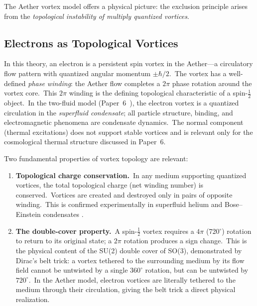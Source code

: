 ﻿\documentclass[12pt,letterpaper]{article}
\begin{document}
The Aether vortex model offers a physical picture: the exclusion principle arises
from the \emph{topological instability of multiply quantized vortices}.

\subsection{Electrons as Topological Vortices}

In this theory, an electron is a persistent spin vortex in the Aether---a
circulatory flow pattern with quantized angular momentum $\pm\hbar/2$.\ The
vortex has a well-defined \emph{phase winding}: the Aether flow completes a $2\pi$
phase rotation around the vortex core.\ This $2\pi$ winding is the defining
topological characteristic of a spin-$\tfrac{1}{2}$ object.\ In the two-fluid
model (Paper~6~\cite{otto-cosmology}), the electron vortex is a quantized
circulation in the \emph{superfluid condensate}; all particle structure, binding,
and electromagnetic phenomena are condensate dynamics.\ The normal component
(thermal excitations) does not support stable vortices and is relevant only for
the cosmological thermal structure discussed in Paper~6.

Two fundamental properties of vortex topology are relevant:

\begin{enumerate}[leftmargin=2em]
  \item \textbf{Topological charge conservation.}\ In any medium supporting
    quantized vortices, the total topological charge (net winding number) is
    conserved.\ Vortices are created and destroyed only in pairs of opposite
    winding.\ This is confirmed experimentally in superfluid helium and
    Bose--Einstein condensates \cite{matthews1999}.

  \item \textbf{The double-cover property.}\ A spin-$\tfrac{1}{2}$ vortex
    requires a $4\pi$ (720$^\circ$) rotation to return to its original state; a
    $2\pi$ rotation produces a sign change.\ This is the physical content of the
    SU(2) double cover of SO(3), demonstrated by Dirac's belt trick: a vortex
    tethered to the surrounding medium by its flow field cannot be untwisted by a
    single $360^\circ$ rotation, but can be untwisted by $720^\circ$.\ In the
    Aether model, electron vortices are literally tethered to the medium through
    their circulation, giving the belt trick a direct physical realization.
\end{enumerate}
\end{document}
